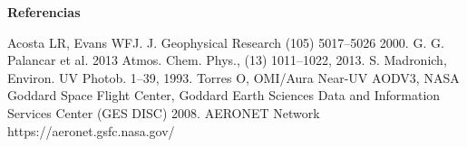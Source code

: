 \documentclass{article}
\begin{document}
\begin{minipage}{0.45\linewidth}
\begin{center}
\begin{shaded}
\textbf{\textcolor{ver}{Referencias}}
\end{shaded}
\end{center}
\changefontsizes{9pt}
\vspace{-0.7cm}
\begin{enumerate}
 Acosta LR, Evans WFJ. J. Geophysical Research (105) 5017–5026 2000.
 G. G. Palancar et al. 2013 Atmos. Chem. Phys., (13) 1011–1022, 2013.
 S. Madronich, Environ. UV Photob. 1–39, 1993.
 Torres O, OMI/Aura Near-UV AODV3, NASA Goddard Space Flight Center, Goddard
Earth Sciences Data and Information Services Center (GES DISC) 2008.
 AERONET Network https://aeronet.gsfc.nasa.gov/
\end{enumerate}
\end{minipage}
\end{document}
